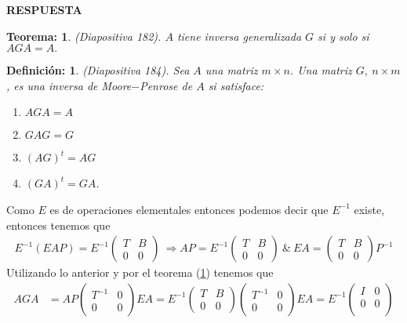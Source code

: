 \documentclass[11pt,letterpaper]{article}
\newcommand{\res}{\textbf{RESPUESTA}\\}
\newtheorem{thmt}{Teorema:}
\newtheorem{thmd}{Definición:}
\begin{document}
\begin{enumerate}
\res \begin{framed}
\begin{thmt} \label{t_inversa}
	(Diapositiva 182). $A$ tiene inversa generalizada $G$ si y solo si $AGA=A.$
	    \end{thmt}
\end{framed}
\begin{framed}
\begin{thmd} \label{t_inversa_propiedades}
	(Diapositiva 184). Sea $A$  una matriz $m\times n$. Una matriz $G, \ n\times m$, es una inversa de Moore$-$Penrose de $A$ si satisface:
	\begin{enumerate}
	\item $AGA=A$
	\item $GAG=G$
	\item $(AG)^t=AG$
	\item $(GA)^t=GA$.
	\end{enumerate}
	    \end{thmd}
\end{framed}
Como $E$ es de operaciones elementales entonces podemos decir que $E^{-1}$ existe, entonces tenemos que 
\begin{align*}
E^{-1}(EAP)= E^{-1}\begin{pmatrix}
T & B\\
0 & 0
\end{pmatrix} \ \Rightarrow AP=E^{-1}\begin{pmatrix}
T & B\\
0 & 0
\end{pmatrix} \ \& \ EA = \begin{pmatrix}
T & B\\
0 & 0
\end{pmatrix}P^{-1}
\end{align*}
Utilizando lo anterior y por el teorema (\ref{t_inversa}) tenemos que
\begin{align*}
AGA&= AP\begin{pmatrix}
T^{-1} & 0\\
0 & 0
\end{pmatrix}EA  = E^{-1}\begin{pmatrix}
T & B\\
0 & 0
\end{pmatrix}\begin{pmatrix}
T^{-1} & 0\\
0 & 0
\end{pmatrix}EA = E^{-1}\begin{pmatrix}
I & 0\\
0 & 0\\

\end{pmatrix}
\end{align*}
\end{enumerate}
\end{document}
